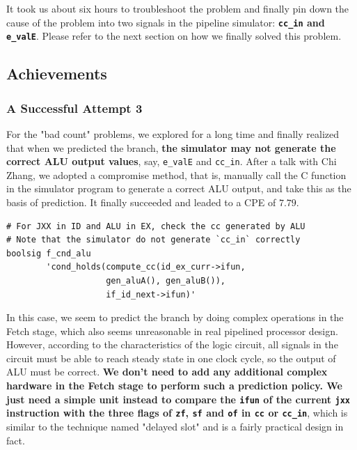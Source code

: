 \documentclass{article}
\begin{document}
It took us about six hours to troubleshoot the problem and finally pin down the cause of the problem into two signals in the pipeline simulator: \textbf{\texttt{cc\_in} and \texttt{e\_valE}}. Please refer to the next section on how we finally solved this problem.
\subsection{Achievements}
\subsubsection{A Successful Attempt 3}
For the "bad count" problems, we explored for a long time and finally realized that when we predicted the branch, \textbf{the simulator may not generate the correct ALU output values}, say, \texttt{e\_valE} and \texttt{cc\_in}. After a talk with Chi Zhang, we adopted a compromise method, that is, manually call the C function in the simulator program to generate a correct ALU output, and take this as the basis of prediction. It finally succeeded and leaded to a CPE of $7.79$.

\begin{lstlisting}
# For JXX in ID and ALU in EX, check the cc generated by ALU
# Note that the simulator do not generate `cc_in` correctly
boolsig f_cnd_alu 
        'cond_holds(compute_cc(id_ex_curr->ifun, 
                    gen_aluA(), gen_aluB()), 
                    if_id_next->ifun)'
\end{lstlisting}

In this case, we seem to predict the branch by doing complex operations in the Fetch stage, which also seems unreasonable in real pipelined processor design. However, according to the characteristics of the logic circuit, all signals in the circuit must be able to reach steady state in one clock cycle, so the output of ALU must be correct. \textbf{We don't need to add any additional complex hardware in the Fetch stage to perform such a prediction policy. We just need a simple unit instead to compare the \texttt{ifun} of the current \texttt{jxx} instruction with the three flags of \texttt{zf}, \texttt{sf} and \texttt{of} in \texttt{cc} or \texttt{cc\_in}}, which is similar to the technique named "delayed slot" and is a fairly practical design in fact. 
\end{document}
